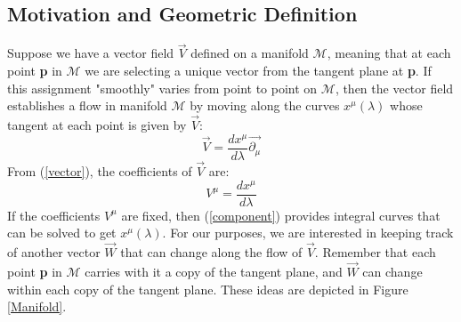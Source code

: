 \documentclass[10pt]{article}
\begin{document}
     \subsection{Motivation and Geometric Definition}
Suppose we have a vector field $\vec V$ defined on a manifold $\mathcal{M}$, meaning that at each point \textbf{{\small p}} in $\mathcal{M}$ we are selecting a unique vector from the tangent plane at \textbf{{\small p}}. If this assignment "smoothly" varies from point to point on $\mathcal{M}$, then the vector field establishes a flow in manifold $\mathcal{M}$ by moving along the curves $x^\mu(\lambda)$ whose tangent at each point is given by $\vec V$:    
\begin{equation}
\label{vector}
   \vec V = \frac{dx^{\mu}}{d\lambda} \vec{\partial_{\mu}} 
\end{equation}
From (\ref{vector}), the coefficients of $\vec V$ are:
\begin{equation}
\label{component}
   V^\mu = \frac{dx^{\mu}}{d\lambda}
\end{equation}
If the coefficients $V^\mu$ are fixed, then (\ref{component}) provides integral curves that can be solved to get $x^\mu(\lambda)$. For our purposes, we are interested in keeping track of another vector $\vec W$ that can change along the flow of $\vec V$.  Remember that each point \textbf{{\small p}} in $\mathcal{M}$ carries with it a copy of the tangent plane, and $\vec W$ can change within each copy of the tangent plane. These ideas are depicted in Figure \ref{Manifold}. 
\end{document}
